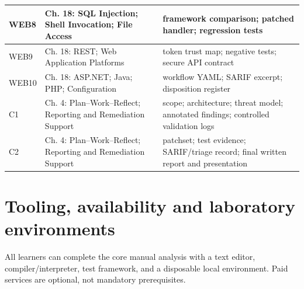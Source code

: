 \documentclass[10pt,letterpaper]{article}
\begin{document}
\begin{longtable}{>{\raggedright\arraybackslash}p{}>{\raggedright\arraybackslash}p{}>{\raggedright\arraybackslash}p{}}
WEB8 & Ch. 18: SQL Injection; Shell Invocation; File Access & framework comparison; patched handler; regression tests\\\midrule
WEB9 & Ch. 18: REST; Web Application Platforms & token trust map; negative tests; secure API contract\\\midrule
WEB10 & Ch. 18: ASP.NET; Java; PHP; Configuration & workflow YAML; SARIF excerpt; disposition register\\\midrule
C1 & Ch. 4: Plan--Work--Reflect; Reporting and Remediation Support & scope; architecture; threat model; annotated findings; controlled validation logs\\\midrule
C2 & Ch. 4: Plan--Work--Reflect; Reporting and Remediation Support & patchset; test evidence; SARIF/triage record; final written report and presentation\\\midrule
\bottomrule\end{longtable}\endgroup
\section{Tooling, availability and laboratory environments}
All learners can complete the core manual analysis with a text editor, compiler/interpreter, test framework, and a disposable local environment. Paid services are optional, not mandatory prerequisites.
\end{document}

